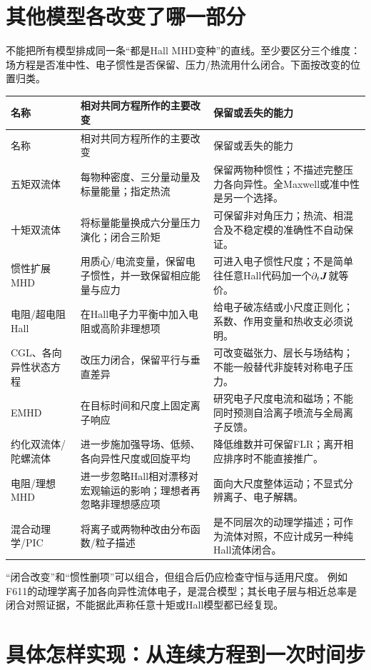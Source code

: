 \documentclass[UTF8,a4paper,11pt,openany,fontset=fandol]{ctexbook}
\begin{document}
\section{其他模型各改变了哪一部分}
不能把所有模型排成同一条“都是Hall MHD变种”的直线。至少要区分三个维度：场方程是否准中性、电子惯性是否保留、压力/热流用什么闭合。下面按改变的位置归类。
\begin{longtable}{P{27mm}P{61mm}P{60mm}}
\toprule 名称 & 相对共同方程所作的主要改变 & 保留或丢失的能力\\\midrule\endfirsthead
\toprule 名称 & 相对共同方程所作的主要改变 & 保留或丢失的能力\\\midrule\endhead
五矩双流体 & 每物种密度、三分量动量及标量能量；指定热流 & 保留两物种惯性；不描述完整压力各向异性。全Maxwell或准中性是另一个选择。\\
十矩双流体 & 将标量能量换成六分量压力演化；闭合三阶矩 & 可保留非对角压力；热流、相混合及不稳定模的准确性不自动保证。\\
惯性扩展MHD & 用质心/电流变量，保留电子惯性，并一致保留相应能量与应力 & 可进入电子惯性尺度；不是简单往任意Hall代码加一个$\partial_t\bm{J}$就等价。\\
电阻/超电阻Hall & 在Hall电子力平衡中加入电阻或高阶非理想项 & 给电子破冻结或小尺度正则化；系数、作用变量和热收支必须说明。\\
CGL、各向异性状态方程 & 改压力闭合，保留平行与垂直差异 & 可改变磁张力、层长与场结构；不能一般替代非旋转对称电子压力。\\
EMHD & 在目标时间和尺度上固定离子响应 & 研究电子尺度电流和磁场；不能同时预测自洽离子喷流与全局离子反馈。\\
约化双流体/陀螺流体 & 进一步施加强导场、低频、各向异性尺度或回旋平均 & 降低维数并可保留FLR；离开相应排序时不能直接推广。\\
电阻/理想MHD & 进一步忽略Hall相对漂移对宏观输运的影响；理想者再忽略非理想感应项 & 面向大尺度整体运动；不显式分辨离子、电子解耦。\\
混合动理学/PIC & 将离子或两物种改由分布函数/粒子描述 & 是不同层次的动理学描述；可作为流体对照，不应计成另一种纯Hall流体闭合。\\
\bottomrule
\end{longtable}
“闭合改变”和“惯性删项”可以组合，但组合后仍应检查守恒与适用尺度。
例如F611的动理学离子加各向异性流体电子，是混合模型；其长电子层与相近总率是闭合对照证据，不能据此声称任意十矩或Hall模型都已经复现。\citep{F611,Wang2015,Andres2016}

\section{具体怎样实现：从连续方程到一次时间步}
\end{document}
